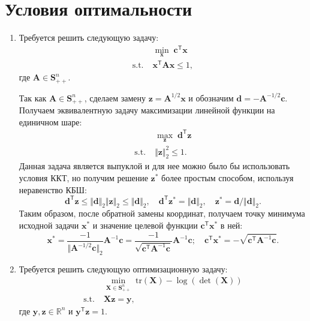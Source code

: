 \documentclass[a4paper,12pt]{article}
\renewcommand{\leq}{\leqslant}
\newcommand{\tr}{\text{tr}}
\begin{document}
	\section{Условия оптимальности}
	\begin{enumerate}
		\item Требуется решить следующую задачу:
		\begin{equation*}
		\begin{aligned}
			& \min\limits_\mathbf{x}\; \mathbf{c}^\mathsf{T} \mathbf{x} \\
			\text{s.t.}\; & \mathbf{x}^\mathsf{T} \mathbf{A} \mathbf{x} \leq 1,
		\end{aligned}
		\end{equation*}
		где $\mathbf{A}\in\mathbf{S}^n_{++}$.
	
	Так как $\mathbf{A}\in\mathbf{S}^n_{++}$, сделаем замену $\mathbf{z} = \mathbf{A}^{1/2}\mathbf{x}$ и обозначим $\mathbf{d} = - \mathbf{A}^{-1/2} \mathbf{c}$. Получаем эквивалентную задачу максимизации линейной функции на единичном шаре:
	\begin{equation*}
		\begin{aligned}
			& \max\limits_\mathbf{z}\; \mathbf{d}^\mathsf{T} \mathbf{z} \\
			\text{s.t.}\; & \Vert\mathbf{z}\Vert^2_2 \leq 1.
		\end{aligned}
	\end{equation*}
	Данная задача является выпуклой и для нее можно было бы использовать условия ККТ, но получим решение $\mathbf{z}^*$ более простым способом, используя неравенство КБШ:
	$$
	\mathbf{d}^\mathsf{T} \mathbf{z} \leq \Vert\mathbf{d}\Vert_2 \Vert\mathbf{z}\Vert_2 \leq \Vert\mathbf{d}\Vert_2,\quad \mathbf{d}^\mathsf{T}\mathbf{z}^* = \Vert\mathbf{d}\Vert_2,\quad \mathbf{z}^* = \mathbf{d} / \Vert\mathbf{d}\Vert_2.
	$$
	Таким образом, после обратной замены координат, получаем точку минимума исходной задачи $\mathbf{x}^*$ и значение целевой функции $\mathbf{c}^\mathsf{T} \mathbf{x}^*$ в ней:
	$$
	\mathbf{x}^* =  \frac{-1}{\Vert \mathbf{A}^{-1/2} \mathbf{c}\Vert_2} \mathbf{A}^{-1}\mathbf{c} = \frac{-1}{\sqrt{\mathbf{c}^\mathsf{T} \mathbf{A}^{-1} \mathbf{c}}} \mathbf{A}^{-1}\mathbf{c};\quad \mathbf{c}^\mathsf{T} \mathbf{x}^* = - \sqrt{\mathbf{c}^\mathsf{T} \mathbf{A}^{-1} \mathbf{c}}.
	$$
	
	\item Требуется решить следующую оптимизационную задачу: 
	\begin{equation*}
		\begin{aligned}
			& \min\limits_{\mathbf{X}\in\mathbf{S}_{++}^n}\; \tr(\mathbf{X}) - \log(\det(\mathbf{X})) \\
			\text{s.t.}\; & \mathbf{X}\mathbf{z} = \mathbf{y},
		\end{aligned}
	\end{equation*}
	где $\mathbf{y},\mathbf{z}\in\mathbb{R}^n$ и $\mathbf{y}^\mathsf{T}\mathbf{z} = 1$.
	

\end{enumerate}
\end{document}
